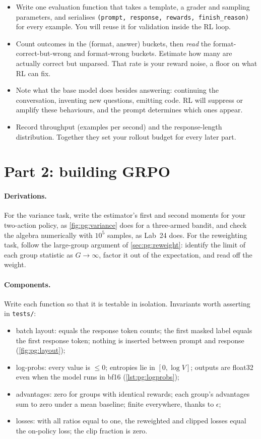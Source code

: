 \begin{itemize}
\item Write one evaluation function that takes a template, a grader and sampling parameters, and
  serialises \texttt{(prompt, response, rewards, finish\_reason)} for every example. You will reuse it
  for validation inside the RL loop.
\item Count outcomes in the (format, answer) buckets, then \emph{read} the format-correct-but-wrong
  and format-wrong buckets. Estimate how many are actually correct but unparsed. That rate is your
  reward noise, a floor on what RL can fix.
\item Note what the base model does besides answering: continuing the conversation, inventing new
  questions, emitting code. RL will suppress or amplify these behaviours, and the prompt determines
  which ones appear.
\item Record throughput (examples per second) and the response-length distribution. Together they
  set your rollout budget for every later part.
\end{itemize}

\section{Part 2: building GRPO}\label{sec:proj5:grpo}

\paragraph{Derivations.} For the variance task, write the estimator's first and second moments for
your two-action policy, as \cref{fig:pg:variance} does for a three-armed bandit, and check the algebra
numerically with $10^5$ samples, as Lab~24 does. For the reweighting task, follow the large-group
argument of \cref{sec:pg:reweight}: identify the limit of each group statistic as $G\to\infty$, factor
it out of the expectation, and read off the weight.

\paragraph{Components.} Write each function so that it is testable in isolation. Invariants worth
asserting in \texttt{tests/}:
\begin{itemize}
\item batch layout:  equals the response token counts; the first masked
  label equals the first response token; nothing is inserted between prompt and response
  (\cref{fig:pg:layout});
\item log-probs: every value is $\le0$; entropies lie in $[0,\log V]$; outputs are float32 even when the
  model runs in bf16 (\cref{lst:pg:logprobs});
\item advantages: zero for groups with identical rewards; each group's advantages sum to zero under a
  mean baseline; finite everywhere, thanks to $\epsilon$;
\item losses: with all ratios equal to one, the reweighted and clipped losses equal the on-policy loss;
  the clip fraction is zero.
\end{itemize}

